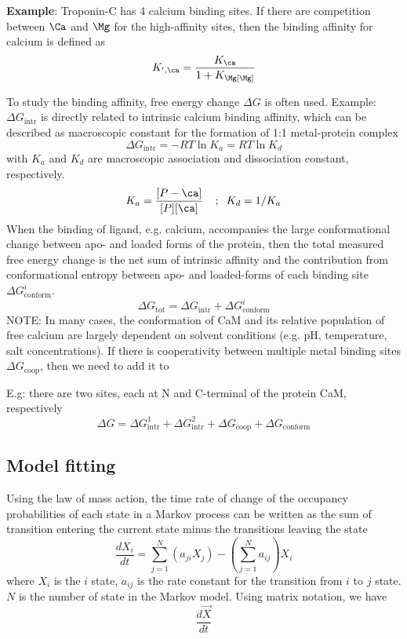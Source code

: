 {\bf Example}: Troponin-C has 4 calcium binding sites. If there are competition
between $\Ca$ and $\Mg$ for the high-affinity sites, then the binding affinity
for calcium is defined as \citep{Potter1975}
\begin{equation}
K_{',\ca} = \frac{K_\ca}{1 + K_\Mg [\Mg]}
\end{equation}

To study the binding affinity, free energy change $\Delta G$ is often used.
Example: $\Delta G_\text{intr}$ is directly related to intrinsic calcium binding
affinity, which can be described as macroscopic constant for the formation of
1:1 metal-protein complex
\begin{equation}
\Delta G_\text{intr} = - RT\ln K_a = RT\ln K_d
\end{equation}
with $K_a$ and $K_d$ are macroscopic association and dissociation constant,
respectively.
\begin{equation}
K_a = \frac{[P-\ca]}{[P][\ca]} \;\;\;\;; \;\; K_d = 1/K_a
\end{equation}
When the binding of ligand, e.g. calcium, accompanies the large conformational
change between apo- and loaded forms of the protein, then the total measured
free energy change is the net sum of intrinsic affinity and the contribution
from conformational entropy between apo- and loaded-forms of each binding site
$\Delta G^i_\text{conform}$.
\begin{equation}
\Delta G_\text{tot} = \Delta G_\text{intr} + \Delta G^i_\text{conform}
\end{equation}
NOTE: In many cases, the conformation of CaM and its relative population of
free calcium are largely dependent on solvent conditions (e.g. pH, temperature,
salt concentrations). If there is cooperativity between multiple metal binding
sites $\Delta G_\text{coop}$, then we need to add it to

E.g: there are two sites, each at N and C-terminal of the protein CaM,
respectively \citep{yang2003}
\begin{equation}
\Delta G = \Delta G^1_\text{intr} + \Delta G^2_\text{intr} + \Delta
G_\text{coop} + \Delta G_\text{conform}
\end{equation}


\subsection{Model fitting}
\label{sec:model-fitting}

Using the law of mass action, the time rate of change of the occupancy
probabilities of each state in a Markov process can be written as the sum of
transition entering the current state minus the transitions leaving the state
\begin{equation}
\frac{dX_i}{dt} = \sum_{j=1}^N \left(a_{ji} X_j \right) - \left( \sum_{j=1}^N
a_{ij} \right)X_{i}
\end{equation}
where $X_i$ is the $i$ state, $a_{ij}$ is the rate constant for the
transition from $i$ to $j$ state. $N$ is the number of state in the Markov
model. Using matrix notation, we have
\begin{equation}
\frac{d\overrightarrow{X}}{dt}
\end{equation}

